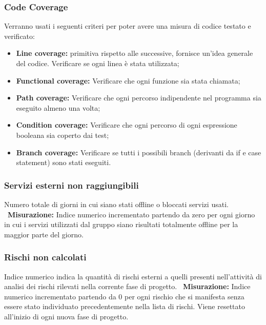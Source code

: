 	 	\subsubsection{Code Coverage} Verranno usati i seguenti criteri per poter avere una misura di codice testato e verificato:\newline
	 		\begin{itemize}
	 			\item \textbf{Line coverage:} primitiva rispetto alle successive, fornisce un’idea generale del codice. Verificare se ogni linea è stata utilizzata;
	 			\item \textbf{Functional coverage:} Verificare che ogni funzione sia stata chiamata;
	 			\item \textbf{Path coverage:} Verificare che ogni percorso indipendente nel programma sia eseguito almeno una volta;
	 			\item \textbf{Condition coverage:} Verificare che ogni percorso di ogni espressione booleana sia coperto dai test; 
	 			\item \textbf{Branch coverage:} Verificare se tutti i possibili branch (derivanti da if e case statement) sono stati eseguiti.
	 		\end{itemize}
		 \subsubsection{Servizi esterni non raggiungibili} Numero totale di giorni in cui siano stati offline o bloccati servizi usati.\newline
		 ~\newline\textbf{Misurazione:} Indice numerico incrementato partendo da zero per ogni giorno
in cui i servizi utilizzati dal gruppo siano risultati totalmente offline per la maggior parte del giorno.\newline
		\subsubsection{Rischi non calcolati} Indice numerico indica la quantità di rischi esterni a quelli presenti nell’attività di
analisi dei rischi rilevati nella corrente fase di progetto.
\newline
		~\newline\textbf{Misurazione:} Indice numerico incrementato partendo da 0 per ogni rischio che
si manifesta senza essere stato individuato precedentemente nella lista di rischi.
		Viene resettato all’inizio di ogni nuova fase di progetto.
		\newline
